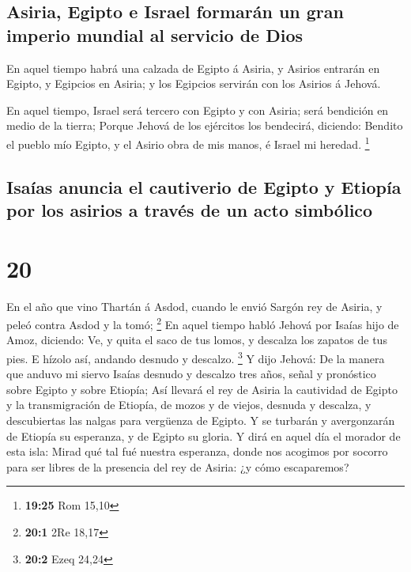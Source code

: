 \hypertarget{asiria-egipto-e-israel-formaruxe1n-un-gran-imperio-mundial-al-servicio-de-dios}{%
\subsection{Asiria, Egipto e Israel formarán un gran imperio mundial al
servicio de
Dios}\label{asiria-egipto-e-israel-formaruxe1n-un-gran-imperio-mundial-al-servicio-de-dios}}

 En aquel tiempo habrá una calzada de Egipto á Asiria, y
Asirios entrarán en Egipto, y Egipcios en Asiria; y los Egipcios
servirán con los Asirios á Jehová.

 En aquel tiempo, Israel será tercero con Egipto y con
Asiria; será bendición en medio de la tierra;  Porque
Jehová de los ejércitos los bendecirá, diciendo: Bendito el pueblo mío
Egipto, y el Asirio obra de mis manos, é Israel mi heredad. \footnote{\textbf{19:25}
  Rom 15,10}

\hypertarget{isauxedas-anuncia-el-cautiverio-de-egipto-y-etiopuxeda-por-los-asirios-a-travuxe9s-de-un-acto-simbuxf3lico}{%
\subsection{Isaías anuncia el cautiverio de Egipto y Etiopía por los
asirios a través de un acto
simbólico}\label{isauxedas-anuncia-el-cautiverio-de-egipto-y-etiopuxeda-por-los-asirios-a-travuxe9s-de-un-acto-simbuxf3lico}}

\hypertarget{section-19}{%
\section{20}\label{section-19}}

 En el año que vino Thartán á Asdod, cuando le envió
Sargón rey de Asiria, y peleó contra Asdod y la tomó; \footnote{\textbf{20:1}
  2Re 18,17}  En aquel tiempo habló Jehová por Isaías hijo
de Amoz, diciendo: Ve, y quita el saco de tus lomos, y descalza los
zapatos de tus pies. E hízolo así, andando desnudo y descalzo.
\footnote{\textbf{20:2} Ezeq 24,24}  Y dijo Jehová: De la
manera que anduvo mi siervo Isaías desnudo y descalzo tres años, señal y
pronóstico sobre Egipto y sobre Etiopía;  Así llevará el
rey de Asiria la cautividad de Egipto y la transmigración de Etiopía, de
mozos y de viejos, desnuda y descalza, y descubiertas las nalgas para
vergüenza de Egipto.  Y se turbarán y avergonzarán de
Etiopía su esperanza, y de Egipto su gloria.  Y dirá en
aquel día el morador de esta isla: Mirad qué tal fué nuestra esperanza,
donde nos acogimos por socorro para ser libres de la presencia del rey
de Asiria: ¿y cómo escaparemos?

